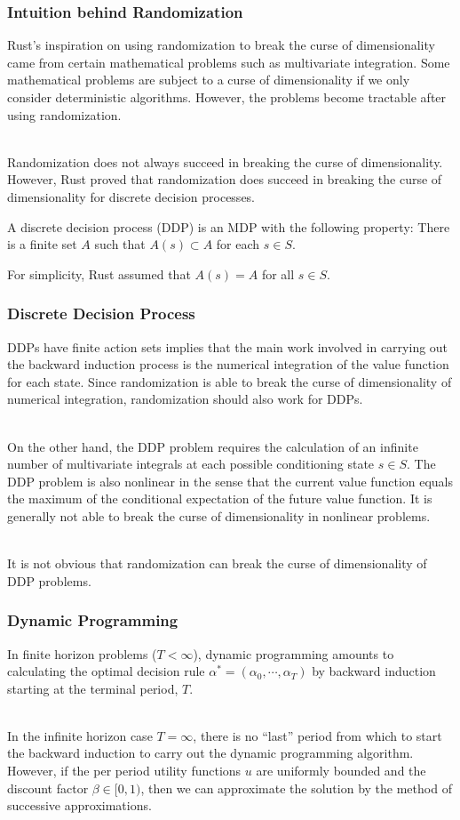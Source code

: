 \documentclass{beamer}
\begin{document}
\begin{frame}[fragile]
\frametitle{Intuition behind Randomization}

Rust's inspiration on using randomization to break the curse of dimensionality came from certain mathematical problems such as multivariate integration. Some mathematical problems are subject to a curse of dimensionality if we only consider deterministic algorithms. However, the problems become tractable after using randomization. \\~\

Randomization does not always succeed in breaking the curse of dimensionality. However, Rust proved that randomization does succeed in breaking the curse of dimensionality for discrete decision processes.
\begin{definition}
A discrete decision process (DDP) is an MDP with the following property: There is a finite set $A$ such that $A(s)\subset A$ for each $s\in S$.
\end{definition}
For simplicity, Rust assumed that $A(s)=A$ for all $s\in S$.
\end{frame}

\begin{frame}[fragile]
\frametitle{Discrete Decision Process}

DDPs have finite action sets implies that the main work involved in carrying out the backward induction process is the numerical integration of the value function for each state. Since randomization is able to break the curse of dimensionality of numerical integration, randomization should also work for DDPs. \\~\

On the other hand, the DDP problem requires the calculation of an infinite number of multivariate integrals at each possible conditioning state $s\in S$. The DDP problem is also nonlinear in the sense that the current value function equals the maximum of the conditional expectation of the future value function. It is generally not able to break the curse of dimensionality in nonlinear problems. \\~\

It is not obvious that randomization can break the curse of dimensionality of DDP problems.
\end{frame}

\begin{frame}[fragile]
\frametitle{Dynamic Programming}

In finite horizon problems ($T<\infty$), dynamic programming amounts to calculating the optimal decision rule $\alpha^*=(\alpha_0, \cdots, \alpha_T)$ by backward induction starting at the terminal period, $T$. \\~\

In the infinite horizon case $T=\infty$, there is no ``last'' period from which to start the backward induction to carry out the dynamic programming algorithm. However, if the per period utility functions $u$ are uniformly bounded and the discount factor $\beta\in[0, 1)$, then we can approximate the solution by the method of successive approximations.
\end{frame}
\end{document}
